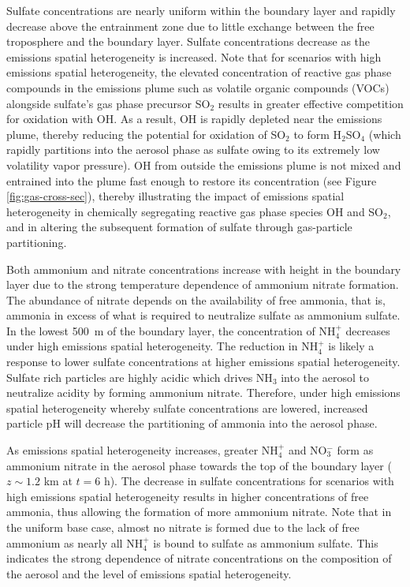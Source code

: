 \documentclass[journal abbreviation, manuscript]{copernicus}
\begin{document}
Sulfate concentrations are nearly uniform within the boundary layer and rapidly decrease above the entrainment zone due to little exchange between the free troposphere and the boundary layer. Sulfate concentrations decrease as the emissions spatial heterogeneity is increased. Note that for scenarios with high emissions spatial heterogeneity, the elevated concentration of reactive gas phase compounds in the emissions plume such as volatile organic compounds (VOCs) alongside sulfate's gas phase precursor SO$_2$ results in greater effective competition for oxidation with OH. As a result, OH is rapidly depleted near the emissions plume, thereby reducing the potential for oxidation of SO$_2$ to form H$_2$SO$_4$ (which rapidly partitions into the aerosol phase as sulfate owing to its extremely low volatility vapor pressure). OH from outside the emissions plume is not mixed and entrained into the plume fast enough to restore its concentration (see Figure \ref{fig:gas-cross-sec}), thereby illustrating the impact of emissions spatial heterogeneity in chemically segregating reactive gas phase species OH and SO$_2$, and in altering the subsequent formation of sulfate through gas-particle partitioning.

Both ammonium and nitrate concentrations increase with height in the boundary layer due to the strong temperature dependence of ammonium nitrate formation. The abundance of nitrate depends on the availability of free ammonia, that is, ammonia in excess of what is required to neutralize sulfate as ammonium sulfate. In the lowest 500~m of the boundary layer, the concentration of NH$_4^+$ decreases under high emissions spatial heterogeneity. The reduction in NH$_4^+$ is likely a response to lower sulfate concentrations at higher emissions spatial heterogeneity. Sulfate rich particles are highly acidic which drives NH$_3$ into the aerosol to neutralize acidity by forming ammonium nitrate. Therefore, under high emissions spatial heterogeneity whereby sulfate concentrations are lowered, increased particle pH will decrease the partitioning of ammonia into the aerosol phase. 

As emissions spatial heterogeneity increases, greater NH$_4^+$ and NO$_3^-$ form as ammonium nitrate in the aerosol phase towards the top of the boundary layer ($z\sim1.2$ km at $t=6$ h). The decrease in sulfate concentrations for scenarios with high emissions spatial heterogeneity results in higher concentrations of free ammonia, thus allowing the formation of more ammonium nitrate. Note that in the uniform base case, almost no nitrate is formed due to the lack of free ammonium as nearly all NH$_4^+$ is bound to sulfate as ammonium sulfate. This indicates the strong dependence of nitrate concentrations on the composition of the aerosol and the level of emissions spatial heterogeneity. 
\end{document}

